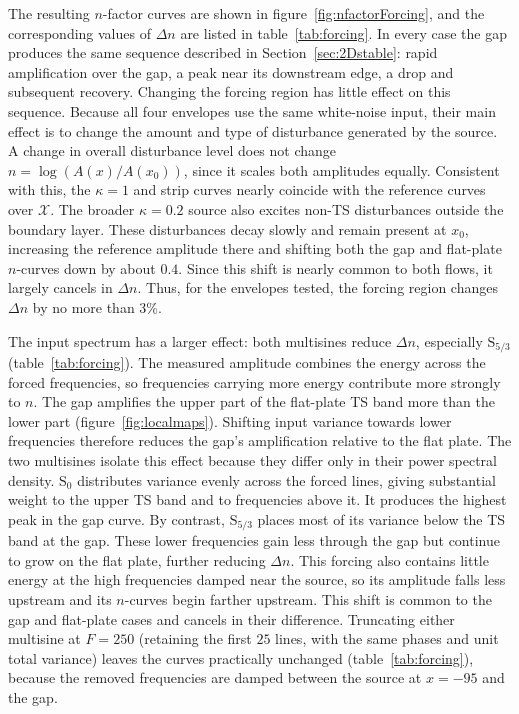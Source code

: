 \documentclass[lineno]{jfm}
\begin{document}
The resulting $n$-factor curves are shown in figure~\ref{fig:nfactorForcing}, and the corresponding values of $\Delta n$ are listed in table~\ref{tab:forcing}. In every case the gap produces the same sequence described in Section~\ref{sec:2Dstable}: rapid amplification over the gap, a peak near its downstream edge, a drop and subsequent recovery. Changing the forcing region has little effect on this sequence. Because all four envelopes use the same white-noise input, their main effect is to change the amount and type of disturbance generated by the source. A change in overall disturbance level does not change $n=\log( A(x)/A(x_0) )$, since it scales both amplitudes equally. Consistent with this, the $\kappa=1$ and strip curves nearly coincide with the reference curves over $\mathcal{X}$. The broader $\kappa=0.2$ source also excites non-\ac{TS} disturbances outside the boundary layer. These disturbances decay slowly and remain present at $x_0$, increasing the reference amplitude there and shifting both the gap and flat-plate $n$-curves down by about $0.4$. Since this shift is nearly common to both flows, it largely cancels in $\Delta n$. Thus, for the envelopes tested, the forcing region changes $\Delta n$ by no more than 3\%.

The input spectrum has a larger effect: both multisines reduce $\Delta n$, especially $\mathrm{S}_{5/3}$ (table~\ref{tab:forcing}). The measured amplitude combines the energy across the forced frequencies, so frequencies carrying more energy contribute more strongly to $n$. The gap amplifies the upper part of the flat-plate \ac{TS} band more than the lower part (figure~\ref{fig:localmaps}). Shifting input variance towards lower frequencies therefore reduces the gap's amplification relative to the flat plate. The two multisines isolate this effect because they differ only in their power spectral density. $\mathrm{S}_0$ distributes variance evenly across the forced lines, giving substantial weight to the upper \ac{TS} band and to frequencies above it. It produces the highest peak in the gap curve. By contrast, $\mathrm{S}_{5/3}$ places most of its variance below the \ac{TS} band at the gap. These lower frequencies gain less through the gap but continue to grow on the flat plate, further reducing $\Delta n$. This forcing also contains little energy at the high frequencies damped near the source, so its amplitude falls less upstream and its $n$-curves begin farther upstream. This shift is common to the gap and flat-plate cases and cancels in their difference. Truncating either multisine at $F=250$ (retaining the first $25$ lines, with the same phases and unit total variance) leaves the curves practically unchanged (table~\ref{tab:forcing}), because the removed frequencies are damped between the source at $x=-95$ and the gap.
\end{document}
